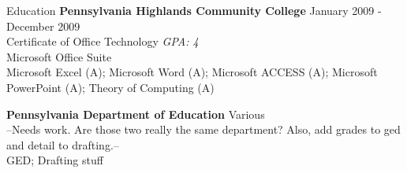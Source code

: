 \documentclass{resume} %
\begin{document}
\begin{rSection}{Education}
{\bf Pennsylvania Highlands Community College} {January 2009 - December 2009} 
\\ Certificate of Office Technology {\em GPA: 4}
\\ Microsoft Office Suite
\smallskip \\
Microsoft Excel (A); Microsoft Word (A); Microsoft ACCESS (A); Microsoft PowerPoint (A); Theory of Computing (A)

{\bf Pennsylvania Department of Education} {Various} 
\\ --Needs work. Are those two really the same department? Also, add grades to ged and detail to drafting.-- {}
\smallskip \\
GED; Drafting stuff
\fi
\end{rSection}

\end{document}
